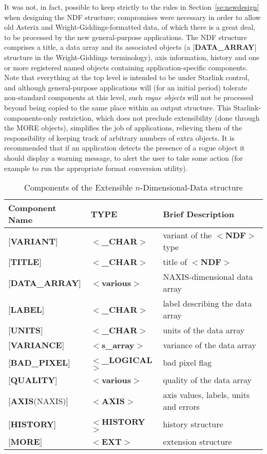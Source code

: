 \documentclass[twoside,11pt]{article}
\newcommand{\htmlref}[2]{#1}
\newcommand{\html}[1]{}
\newcommand{\latex}[1]{#1}
\begin{document}
It was not, in fact, possible to keep strictly to
the rules in \latex{Section~\ref{se:newdesign}}\html{\htmlref{Creating
New Structures}{se:newdesign}} when designing the NDF structure;
compromises were necessary in order to
allow old Asterix and Wright-Giddings-formatted data,
of which there is a great deal,
to be processed by the new general-purpose applications.
The NDF structure comprises a title, a data array and its associated objects
(a {[}{\bf DATA\_ARRAY}{]} structure in the Wright-Giddings terminology),
axis information, history and one or more registered named objects containing
application-specific components.  
Note that everything at the top level is intended to be under Starlink
control, and although general-purpose applications will (for
an initial period) tolerate
non-standard components at this level, such
{\it rogue objects} will not be processed beyond being
copied to the same place within an output structure.  This
Starlink-components-only restriction, which does
not preclude extensibility (done through the MORE objects),
simplifies the job of applications,
relieving them of the responsibility
of keeping track of arbitrary
numbers of extra objects.
It is recommended that if an
application detects the presence of a
rogue object it should
display a warning message, to alert the user to
take some action (for example to run the
appropriate format conversion utility).

\begin{table}[htb]
\centering
\caption{Components of the Extensible $n$-Dimensional-Data structure}
\begin{tabular}{|l|l|l|}
\hline
Component Name & TYPE & Brief Description \\ \hline
{[}{\bf VARIANT}{]} & $<${\bf \_CHAR}$>$ & variant of the $<${\bf NDF}$>$ type \\
{[}{\bf TITLE}{]} & $<${\bf \_CHAR}$>$ & title of $<${\bf NDF}$>$ \\
{[}{\bf DATA\_ARRAY}{]} & $<${\bf various}$>$ & NAXIS-dimensional data array \\
{[}{\bf LABEL}{]} & $<${\bf \_CHAR}$>$ & label describing the data array \\
{[}{\bf UNITS}{]} & $<${\bf \_CHAR}$>$ & units of the data array \\
{[}{\bf VARIANCE}{]} & $<${\bf s\_array}$>$ & variance of the data array \\
{[}{\bf BAD\_PIXEL}{]} & $<${\bf \_LOGICAL}$>$ & bad pixel flag \\
{[}{\bf QUALITY}{]} & $<${\bf various}$>$ & quality of the data array \\
{[}{\bf AXIS}(NAXIS){]} & $<${\bf AXIS}$>$ & axis values, labels, units and errors \\
{[}{\bf HISTORY}{]} & $<${\bf HISTORY}$>$ & history structure \\ 
{[}{\bf MORE}{]} & $<${\bf EXT}$>$  & extension structure \\ \hline
\end{tabular}
\end{table}
\end{document}
